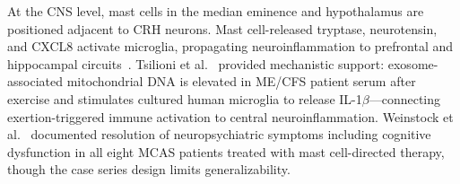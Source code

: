 At the CNS level, mast cells in the median eminence and hypothalamus are positioned adjacent to CRH neurons. Mast cell-released tryptase, neurotensin, and CXCL8 activate microglia, propagating neuroinflammation to prefrontal and hippocampal circuits~\cite{Hatziagelaki2018hypothalamus}. Tsilioni et al.~\cite{Tsilioni2022exosome} provided mechanistic support: exosome-associated mitochondrial DNA is elevated in ME/CFS patient serum after exercise and stimulates cultured human microglia to release IL-1$\beta$---connecting exertion-triggered immune activation to central neuroinflammation. Weinstock et al.~\cite{Weinstock2023MCASneuro} documented resolution of neuropsychiatric symptoms including cognitive dysfunction in all eight MCAS patients treated with mast cell-directed therapy, though the case series design limits generalizability.

